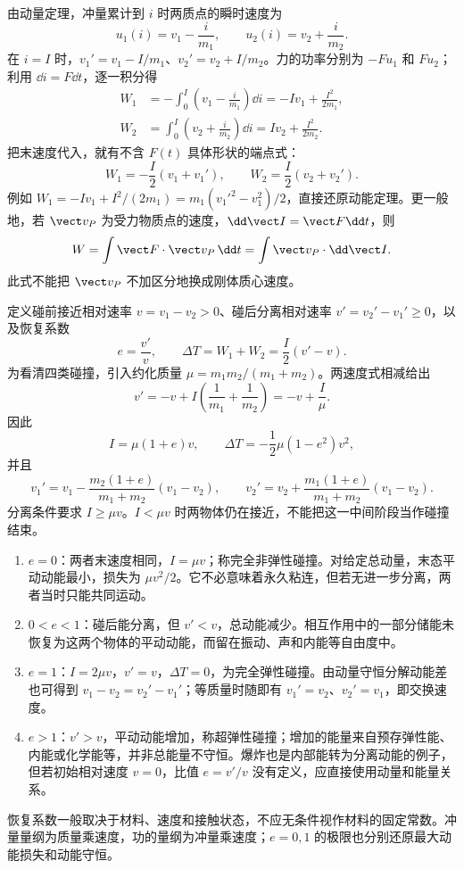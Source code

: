 由动量定理，冲量累计到 $i$ 时两质点的瞬时速度为
\[
 u_1(i)=v_1-\frac{i}{m_1},\qquad
 u_2(i)=v_2+\frac{i}{m_2}.
\]
在 $i=I$ 时，$v_1'=v_1-I/m_1$、$v_2'=v_2+I/m_2$。力的功率分别为 $-Fu_1$ 和 $Fu_2$；利用 $\dd i=F\dd t$，逐一积分得
\[
\begin{aligned}
 W_1&=-\int_0^I\left(v_1-\frac{i}{m_1}\right)\dd i
     =-Iv_1+\frac{I^2}{2m_1},\\
 W_2&= \int_0^I\left(v_2+\frac{i}{m_2}\right)\dd i
     = Iv_2+\frac{I^2}{2m_2}.
\end{aligned}
\]
把末速度代入，就有不含 $F(t)$ 具体形状的端点式：
\begin{equation}
 W_1=-\frac I2(v_1+v_1'),\qquad
 W_2= \frac I2(v_2+v_2').
 \label{r2ch02:eq:026}
\end{equation}
例如 $W_1=-Iv_1+I^2/(2m_1)=m_1(v_1'^2-v_1^2)/2$，直接还原动能定理。更一般地，若 $\vect v_P$ 为受力物质点的速度，$\dd\vect I=\vect F\dd t$，则
\[
 W=\int\vect F\cdot\vect v_P\,\dd t
   =\int\vect v_P\cdot\dd\vect I.
\]
此式不能把 $\vect v_P$ 不加区分地换成刚体质心速度。

定义碰前接近相对速率 $v=v_1-v_2>0$、碰后分离相对速率 $v'=v_2'-v_1'\geqslant0$，以及恢复系数
\begin{equation}
 e=\frac{v'}v,\qquad
 \Delta T=W_1+W_2=\frac I2(v'-v).
 \label{r2ch02:eq:027}
\end{equation}
为看清四类碰撞，引入约化质量 $\mu=m_1m_2/(m_1+m_2)$。两速度式相减给出
\[
 v'= -v+I\left(\frac1{m_1}+\frac1{m_2}\right)
     =-v+\frac I\mu.
\]
因此
\[
 I=\mu(1+e)v,\qquad
 \Delta T=-\frac12\mu(1-e^2)v^2,
\]
并且
\[
 v_1'=v_1-\frac{m_2(1+e)}{m_1+m_2}(v_1-v_2),\qquad
 v_2'=v_2+\frac{m_1(1+e)}{m_1+m_2}(v_1-v_2).
\]
分离条件要求 $I\geqslant\mu v$。$I<\mu v$ 时两物体仍在接近，不能把这一中间阶段当作碰撞结束。
\begin{enumerate}
 \item $e=0$：两者末速度相同，$I=\mu v$；称完全非弹性碰撞。对给定总动量，末态平动动能最小，损失为 $\mu v^2/2$。它不必意味着永久粘连，但若无进一步分离，两者当时只能共同运动。
 \item $0<e<1$：碰后能分离，但 $v'<v$，总动能减少。相互作用中的一部分储能未恢复为这两个物体的平动动能，而留在振动、声和内能等自由度中。
 \item $e=1$：$I=2\mu v$，$v'=v$，$\Delta T=0$，为完全弹性碰撞。由动量守恒分解动能差也可得到 $v_1-v_2=v_2'-v_1'$；等质量时随即有 $v_1'=v_2$、$v_2'=v_1$，即交换速度。
 \item $e>1$：$v'>v$，平动动能增加，称超弹性碰撞；增加的能量来自预存弹性能、内能或化学能等，并非总能量不守恒。爆炸也是内部能转为分离动能的例子，但若初始相对速度 $v=0$，比值 $e=v'/v$ 没有定义，应直接使用动量和能量关系。
\end{enumerate}
恢复系数一般取决于材料、速度和接触状态，不应无条件视作材料的固定常数。冲量量纲为质量乘速度，功的量纲为冲量乘速度；$e=0,1$ 的极限也分别还原最大动能损失和动能守恒。

